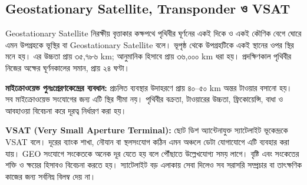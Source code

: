 \subsection{Geostationary Satellite, Transponder ও VSAT}
\begin{definitionbox}{Geostationary Satellite}
নিরক্ষীয় বৃত্তাকার কক্ষপথে পৃথিবীর ঘূর্ণনের একই দিকে ও একই কৌণিক বেগে ঘোরে এমন উপগ্রহকে ভূস্থির বা Geostationary Satellite বলে। ভূপৃষ্ঠ থেকে উপগ্রহটিকে একই স্থানের ওপর স্থির মনে হয়। এর উচ্চতা প্রায় ৩৫,৭৮৬ km; আনুমানিক হিসাবে প্রায় ৩৬,০০০ km ধরা হয়।
প্রদক্ষিণকাল পৃথিবীর নিজের অক্ষের ঘূর্ণনকালের সমান, প্রায় ২৪ ঘণ্টা।
\end{definitionbox}

\textbf{মাইক্রোওয়েভ পুনঃপ্রেরণকেন্দ্রের ব্যবধান:} প্রচলিত ব্যবস্থার উদাহরণে প্রায় ৪০--৫০ km অন্তর টাওয়ার বসানো হয়। সব মাইক্রোওয়েভ সংযোগের জন্য এটি স্থির সীমা নয়। পৃথিবীর বক্রতা, টাওয়ারের উচ্চতা, ফ্রিকোয়েন্সি, বাধা ও আবহাওয়া বিবেচনা করে দূরত্ব নির্ধারণ করা হয়।

\textbf{VSAT (Very Small Aperture Terminal):} ছোট ডিশ অ্যান্টেনাযুক্ত স্যাটেলাইট ভূকেন্দ্রকে VSAT বলে। দূরের ব্যাংক শাখা, নৌযান বা স্থলসংযোগ কঠিন এমন অঞ্চলে ডেটা যোগাযোগে এটি ব্যবহার করা যায়। GEO সংযোগে সংকেতকে অনেক দূর যেতে হয় বলে পৌঁছাতে উল্লেখযোগ্য সময় লাগে। বৃষ্টি এবং সংকেতের শক্তি ও ক্ষয়ের হিসাবও বিবেচনা করতে হয়। স্যাটেলাইট বড় এলাকায় সেবা দিলেও সব সরাসরি সম্প্রচার বা তাৎক্ষণিক কাজের জন্য সর্বনিম্ন বিলম্ব দেয় না।

